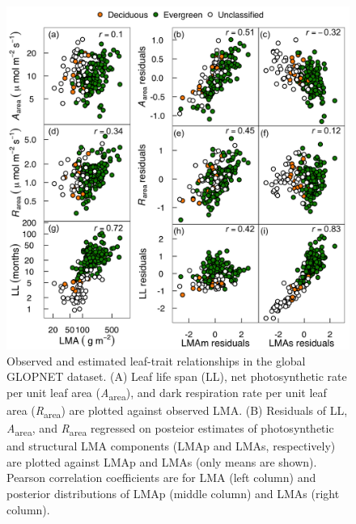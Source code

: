 \documentclass[
  12pt,
]{article}
\begin{document}
\begin{figure}
\hypertarget{fig:GLplt}{%
\centering
\includegraphics{../figs/GL_3.png}
\caption{Observed and estimated leaf-trait relationships in the global GLOPNET dataset.
(A) Leaf life span (LL), net photosynthetic rate per unit leaf area (\emph{A}\textsubscript{area}), and dark respiration rate per unit leaf area (\emph{R}\textsubscript{area}) are plotted against observed LMA.
(B) Residuals of LL, \emph{A}\textsubscript{area}, and \emph{R}\textsubscript{area} regressed on posteior estimates of photosynthetic and structural LMA components (LMAp and LMAs, respectively) are plotted against LMAp and LMAs (only means are shown).
Pearson correlation coefficients are for LMA (left column) and posterior distributions of LMAp (middle column) and LMAs (right column).}\label{fig:GLplt}
}
\end{figure}

\newpage
\end{document}
